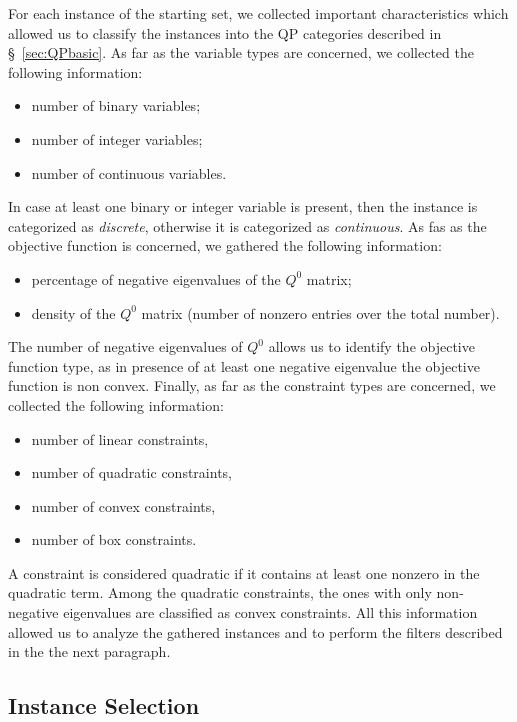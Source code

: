 For each instance of the starting set, we collected important characteristics
which allowed us to classify the instances into the QP categories described in
\S~\ref{sec:QPbasic}. As far as the variable types are concerned, we
collected the following information:
%
\begin{itemize}
 \item number of binary variables; %
 \item number of integer variables; %
 \item number of continuous variables. %
\end{itemize}
%
In case at least one binary or integer variable is present, then the instance is
categorized as \emph{discrete}, otherwise it is categorized as \emph{continuous}.
As fas as the objective function is concerned, we gathered the following
information:
%
\begin{itemize}
 \item percentage of negative eigenvalues of the $Q^0$ matrix;
 \item density of the $Q^0$ matrix (number of nonzero entries over the total
       number). %
\end{itemize}
%
The number of negative eigenvalues of $Q^0$ allows us to identify the
objective function type, as in presence of at least one negative eigenvalue
the objective function is non convex. Finally, as far as the constraint types
are concerned, we collected the following information:
%
\begin{itemize}
 \item number of linear constraints, %
 \item number of quadratic constraints, %
 \item number of convex constraints, %
 \item number of box constraints. %
\end{itemize}
%
A constraint is considered quadratic if it contains at least one nonzero in
the quadratic term. Among the quadratic constraints, the ones with only
non-negative eigenvalues are classified as convex constraints. All this
information allowed us to analyze the gathered instances and to perform the
filters described in the the next paragraph.

\subsection{Instance Selection}\label{subsec:selection}

